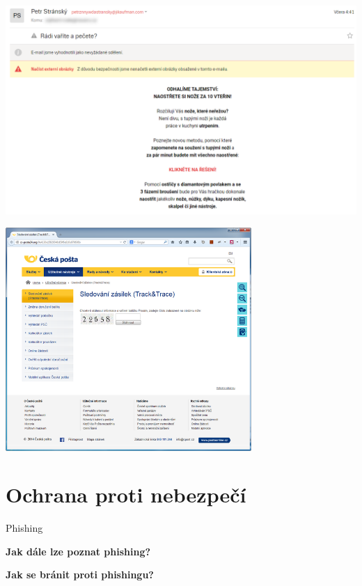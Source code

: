 \documentclass[aspectratio=1610]{beamer}
\begin{document}
\begin{frame}
    \includegraphics[width=\textwidth]{img/spam-1.png}
\end{frame}

\begin{frame}
    \begin{center}
        \includegraphics[width=0.7\textwidth]{img/posta.png}
    \end{center}
\end{frame}



\section{Ochrana proti nebezpečí}

\begin{frame}{Phishing}
    \begin{cardTiny}
        \begin{center}
            \textbf{Jak dále lze poznat phishing?}
        \end{center}
    \end{cardTiny}
    \begin{cardTiny}
        \begin{center}
            \textbf{Jak se bránit proti phishingu?}
        \end{center}
    \end{cardTiny}
\end{frame}
\end{document}

